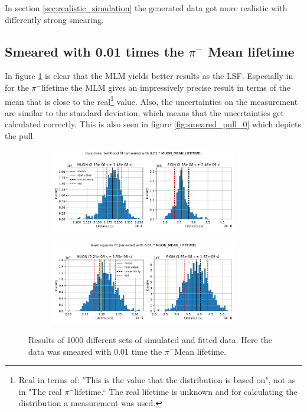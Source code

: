 \documentclass[11pt, a4paper, oneside]{book}
\newcommand\DoublePlotwidth{0.9}
\newcommand{\pion}{$\pi^{-}$}
\begin{document}
In section \ref{sec:realistic_simulation} the generated data got more realistic with differently strong smearing.

\subsection{Smeared with 0.01 times the \texorpdfstring{\pion}{pion} Mean lifetime}

In figure \ref{fig:results_smeared_0} is clear that the MLM yields better results as the LSF. Especially in for the \pion lifetime the MLM gives an impressively precise result in terms of the mean that is close to the real\footnote{Real in terms of: "This is the value that the distribution is based on", not as in "The real \pion lifetime.“ The real lifetime is unknown and for calculating the distribution a measurement was used.} value. Also, the uncertainties on the measurement are similar to the standard deviation, which means that the uncertainties get calculated correctly. This is also seen in figure \ref{fig:smeared_pull_0} which depicts the pull.

\begin{figure}[h]
\begin{subfigure}{\textwidth}
  \centering
  \includegraphics[width=\DoublePlotwidth\textwidth]{images/4b_hist_0_likelihood.pdf}
\end{subfigure}

\begin{subfigure}{\textwidth}
  \centering
  \includegraphics[width=\DoublePlotwidth\textwidth]{images/4b_hist_0_squares.pdf}
\end{subfigure}
\caption{Results of 1000 different sets of simulated and fitted data. Here the data was smeared with 0.01 time the \pion Mean lifetime.}
\label{fig:results_smeared_0}
\end{figure}
\end{document}
